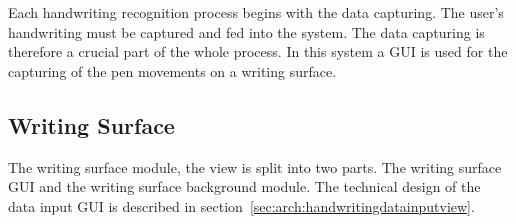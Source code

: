 Each handwriting recognition process begins with the data capturing.
The user's handwriting must be captured and fed into the system. The data 
capturing is therefore a crucial part of the whole process. In this system 
a GUI is used for the capturing of the pen movements on a writing surface.


%  
%  
%
%
%
% 
%

\subsection{Writing Surface} %
\label{sec:hwre:writingsurface}

The writing surface module, the view is split into two parts. The writing 
surface GUI and the writing surface background module. The technical design of 
the data input GUI is described in 
section~\ref{sec:arch:handwritingdatainputview}.

